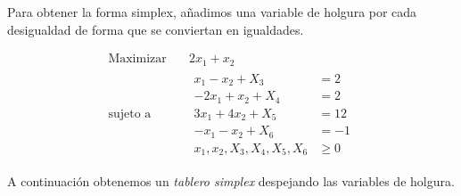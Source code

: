 \documentclass{article}
\begin{document}
Para obtener la forma simplex, añadimos una variable de holgura por cada desigualdad de forma que se conviertan en igualdades.

\begin{equation*}
 \begin{aligned}
\text{Maximizar} \quad & 2x_{1}+x_{2}\\
\text{sujeto a} \quad &
  \begin{aligned}
   x_{1}-x_{2}+X_{3} &= 2\\
   -2x_{1}+x_{2}+X_{4}&= 2\\
   3x_{1}+4x_{2}+X_{5}&= 12\\
   -x_{1}-x_{2}+X_{6}&= -1\\
   x_{1},x_{2},X_{3},X_{4},X_{5},X_{6} &\geq 0
  \end{aligned}
\end{aligned}
\end{equation*}


A continuación obtenemos un \emph{tablero simplex} despejando las variables de holgura.
\end{document}
